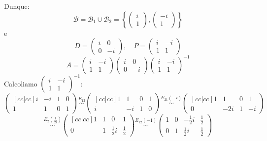 \documentclass[a4paper]{article}
\theoremstyle{break}
\theoremstyle{break}
\theoremstyle{break}
\theoremstyle{break}
\begin{document}
\begin{example}
\begin{itemize}
      \vspace{1em}
      \noindent Dunque:
      \[
      \mathcal{B} = \mathcal{B}_1 \cup \mathcal{B}_2 = \left\{ \begin{pmatrix} i\\1 \end{pmatrix}, \begin{pmatrix} -i\\1 \end{pmatrix}  \right\}
      \] 
      e
      \[
      D = \begin{pmatrix} 
        i & 0\\
        0 & -i
      \end{pmatrix} 
      ,\quad
      P = \begin{pmatrix} 
        i & -i\\
        1 & 1
      \end{pmatrix} 
      \] 
      \[
      A = \begin{pmatrix} 
        i & -i\\
        1 & 1
      \end{pmatrix} 
      \begin{pmatrix} 
        i & 0\\
        0 & -i
      \end{pmatrix} 
      \begin{pmatrix} 
        i & -i\\
        1 & 1
      \end{pmatrix}^{-1}
      \] 
      Calcoliamo \( \begin{pmatrix} 
        i & -i\\
        1 & 1
      \end{pmatrix}^{-1}\):
      \[
        \begin{pmatrix}[cc|cc]
          i & -i & 1 & 0\\
          1 & 1 & 0 & 1
      \end{pmatrix} 
      \stackrel{E_{12}}{\sim}
      \begin{pmatrix}[cc|cc]
        1 & 1 & 0 & 1\\
        i & -i & 1 & 0
      \end{pmatrix} 
      \stackrel{E_{21}(-i)}{\sim}
      \begin{pmatrix}[cc|cc]
        1 & 1 & 0 & 1\\
        0 & -2i & 1 & -i
      \end{pmatrix}
      \] 
      \[
      \stackrel{E_2(\frac{1}{2i})}{\sim}
      \begin{pmatrix}[cc|cc]
        1 & 1 & 0 & 1\\
        0 & 1 & \frac{1}{2}i & \frac{1}{2}
      \end{pmatrix} 
      \stackrel{E_{12}(-1)}{\sim}
      \begin{pmatrix} 
        1 & 0 & -\frac{1}{2}i & \frac{1}{2}\\
        0 & 1 & \frac{1}{2}i & \frac{1}{2}
      \end{pmatrix} 
      \] 


\end{itemize}
\end{example}
\end{document}

